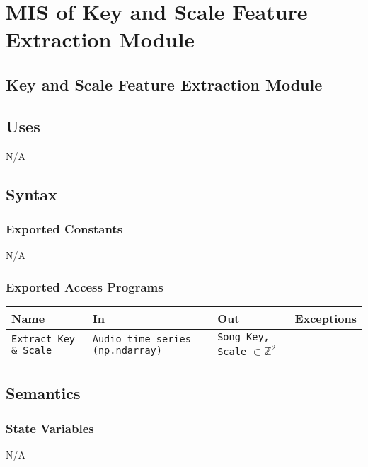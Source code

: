 \documentclass[12pt, titlepage]{article}
\begin{document}
\section{MIS of Key and Scale Feature Extraction Module} 

\subsection{Key and Scale Feature Extraction Module}

\subsection{Uses}
N/A

\subsection{Syntax}

\subsubsection{Exported Constants}
N/A

\subsubsection{Exported Access Programs}

\begin{center}
\begin{tabular}{p{2cm} p{4cm} p{4cm} p{2cm}}
\hline
\textbf{Name} & \textbf{In} & \textbf{Out} & \textbf{Exceptions}\\
\hline%
\texttt{Extract Key \& Scale} &\texttt{Audio time series (np.ndarray)} &\texttt{Song Key, Scale} $\in \mathbb{Z}^2$ &-\\
\hline
\end{tabular}
\end{center}

\subsection{Semantics}

\subsubsection{State Variables}
N/A
\end{document}
